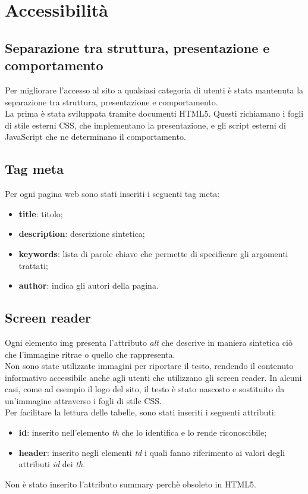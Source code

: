 \section{Accessibilità}
\subsection{Separazione tra struttura, presentazione e comportamento}
Per migliorare l'accesso al sito a qualsiasi categoria di utenti è stata mantenuta la separazione tra struttura, presentazione e comportamento. \\
La prima è stata sviluppata tramite documenti HTML5. Questi richiamano i fogli di stile esterni CSS, che implementano la presentazione, e gli script esterni di JavaScript che ne determinano il comportamento.
\subsection{Tag meta}
Per ogni pagina web sono stati inseriti i seguenti tag meta:
\begin{itemize}
	\item \textbf{title}: titolo;
	\item \textbf{description}: descrizione sintetica;
	\item \textbf{keywords}: lista di parole chiave che permette di specificare gli argomenti trattati;
	\item \textbf{author}: indica gli autori della pagina.
\end{itemize}
\subsection{Screen reader}
Ogni elemento img presenta l'attributo \textit{alt} che descrive in maniera sintetica ciò che l'immagine ritrae o quello che rappresenta. \\ 
Non sono state utilizzate immagini per riportare il testo, rendendo il contenuto informativo accessibile anche agli utenti che utilizzano gli screen reader. In alcuni casi, come ad esempio il logo del sito, il testo è stato nascosto e sostituito da un'immagine attraverso i fogli di stile CSS.\\
Per facilitare la lettura delle tabelle, sono stati inseriti i seguenti attributi:
\begin{itemize}
	\item{\textbf{id}}: inserito nell'elemento \textit{th} che lo identifica e lo rende riconoscibile;
	\item{\textbf{header}}: inserito negli elementi \textit{td} i quali fanno riferimento ai valori degli attributi \textit{id} dei \textit{th}.
\end{itemize}
Non è stato inserito l'attributo summary perchè obsoleto in HTML5.

